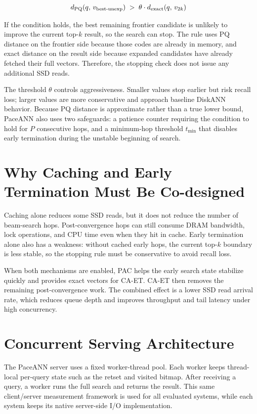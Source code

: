 \begin{equation}
  d_\text{PQ}(q,\, v_\text{best\text{-}unexp}) \;>\; \theta \cdot d_\text{exact}(q,\, v_{2k})
  \label{eq:et-gate}
\end{equation}

If the condition holds, the best remaining frontier candidate is unlikely to improve the current top-$k$ result, so the search can stop.
The rule uses PQ distance on the frontier side because those codes are already in memory, and exact distance on the result side because expanded candidates have already fetched their full vectors.
Therefore, the stopping check does not issue any additional SSD reads.

The threshold $\theta$ controls aggressiveness.
Smaller values stop earlier but risk recall loss; larger values are more conservative and approach baseline DiskANN behavior.
Because PQ distance is approximate rather than a true lower bound, PaceANN also uses two safeguards: a patience counter requiring the condition to hold for $P$ consecutive hops, and a minimum-hop threshold $t_\text{min}$ that disables early termination during the unstable beginning of search.

\section{Why Caching and Early Termination Must Be Co-designed}
\label{sec:codesign}

Caching alone reduces some SSD reads, but it does not reduce the number of beam-search hops.
Post-convergence hops can still consume DRAM bandwidth, lock operations, and CPU time even when they hit in cache.
Early termination alone also has a weakness: without cached early hops, the current top-$k$ boundary is less stable, so the stopping rule must be conservative to avoid recall loss.

When both mechanisms are enabled, PAC helps the early search state stabilize quickly and provides exact vectors for CA-ET.
CA-ET then removes the remaining post-convergence work.
The combined effect is a lower SSD read arrival rate, which reduces queue depth and improves throughput and tail latency under high concurrency.

\section{Concurrent Serving Architecture}
\label{sec:server}

The PaceANN server uses a fixed worker-thread pool.
Each worker keeps thread-local per-query state such as the retset and visited bitmap.
After receiving a query, a worker runs the full search and returns the result.
This same client/server measurement framework is used for all evaluated systems, while each system keeps its native server-side I/O implementation.
